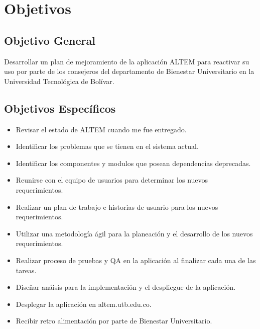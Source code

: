 \section{Objetivos}

\subsection{Objetivo General}
Desarrollar un plan de mejoramiento de la aplicación ALTEM para reactivar su uso por parte de los consejeros del departamento de Bienestar Universitario en la Universidad Tecnológica de Bolívar.

\subsection{Objetivos Específicos}
\begin{itemize}
    \item Revisar el estado de ALTEM cuando me fue entregado.
    \item Identificar los problemas que se tienen en el sistema actual.
    \item Identificar los componentes y modulos que posean dependencias deprecadas.
    \item Reunirse con el equipo de usuarios para determinar los nuevos requerimientos.
    \item Realizar un plan de trabajo e historias de usuario para los nuevos requerimientos.
    \item Utilizar una metodología ágil para la planeación y el desarrollo de los nuevos requerimientos.
    \item Realizar proceso de pruebas y QA en la aplicación al finalizar cada una de las tareas.
    \item Diseñar anáisis para la implementación y el despliegue de la aplicación.
    \item Desplegar la aplicación en altem.utb.edu.co.
    \item Recibir retro alimentación por parte de Bienestar Universitario.
\end{itemize}